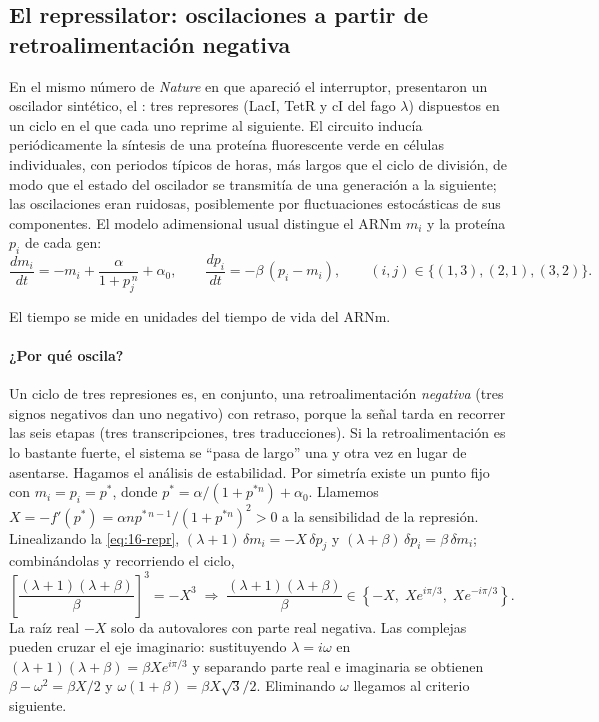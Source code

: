 \subsection{El repressilator: oscilaciones a partir de retroalimentación negativa}

En el mismo número de \emph{Nature} en que apareció el interruptor, \textcite{c16-elowitz2000} presentaron un oscilador sintético, el : tres represores (LacI, TetR y cI del fago $\lambda$) dispuestos en un ciclo en el que cada uno reprime al siguiente. El circuito inducía periódicamente la síntesis de una proteína fluorescente verde en células individuales, con periodos típicos de horas, más largos que el ciclo de división, de modo que el estado del oscilador se transmitía de una generación a la siguiente; las oscilaciones eran ruidosas, posiblemente por fluctuaciones estocásticas de sus componentes. El modelo adimensional usual distingue el ARNm $m_i$ y la proteína $p_i$ de cada gen:
\begin{equation}\label{eq:16-repr}
\frac{dm_i}{dt}=-m_i+\frac{\alpha}{1+p_{j}^{\,n}}+\alpha_0,\qquad
\frac{dp_i}{dt}=-\beta\,(p_i-m_i),\qquad (i,j)\in\{(1,3),(2,1),(3,2)\}.
\end{equation}
\begin{simbolos}
\end{simbolos}
El tiempo se mide en unidades del tiempo de vida del ARNm.

\paragraph{¿Por qué oscila?} Un ciclo de tres represiones es, en conjunto, una retroalimentación \emph{negativa} (tres signos negativos dan uno negativo) con retraso, porque la señal tarda en recorrer las seis etapas (tres transcripciones, tres traducciones). Si la retroalimentación es lo bastante fuerte, el sistema se ``pasa de largo'' una y otra vez en lugar de asentarse. Hagamos el análisis de estabilidad. Por simetría existe un punto fijo con $m_i=p_i=p^*$, donde $p^*=\alpha/(1+p^{*n})+\alpha_0$. Llamemos $X=-f'(p^*)=\alpha n p^{*\,n-1}/(1+p^{*n})^2>0$ a la sensibilidad de la represión. Linealizando la \cref{eq:16-repr}, $(\lambda+1)\,\delta m_i=-X\,\delta p_j$ y $(\lambda+\beta)\,\delta p_i=\beta\,\delta m_i$; combinándolas y recorriendo el ciclo,
\[
\left[\frac{(\lambda+1)(\lambda+\beta)}{\beta}\right]^3=-X^3
\;\Longrightarrow\;
\frac{(\lambda+1)(\lambda+\beta)}{\beta}\in\left\{-X,\;X e^{i\pi/3},\;X e^{-i\pi/3}\right\}.
\]
La raíz real $-X$ solo da autovalores con parte real negativa. Las complejas pueden cruzar el eje imaginario: sustituyendo $\lambda=i\omega$ en $(\lambda+1)(\lambda+\beta)=\beta X e^{i\pi/3}$ y separando parte real e imaginaria se obtienen $\beta-\omega^2=\beta X/2$ y $\omega(1+\beta)=\beta X\sqrt3/2$. Eliminando $\omega$ llegamos al criterio siguiente.

